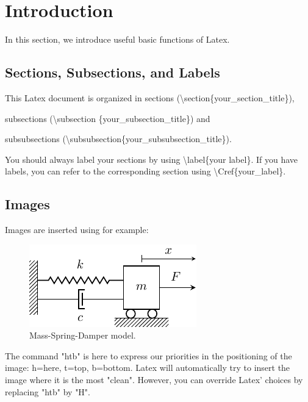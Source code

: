 \section{Introduction}\label{introduction}


In this section, we introduce useful basic functions of Latex. 
    
\subsection{Sections, Subsections, and Labels}\label{sections_subsections_labels}

This Latex document is organized in sections (\textbackslash section\{your\_section\_title\}), 

subsections (\textbackslash subsection \{your\_subsection\_title\}) and 

subsubsections (\textbackslash subsubsection\{your\_subsubsection\_title\}).

You should always label your sections by using \textbackslash label\{your label\}. If you have labels, you can refer to the corresponding section using \textbackslash Cref\{your\_label\}.


\subsection{Images}\label{images}

Images are inserted using for example:

\begin{figure}[htb]
    \centering
    \includegraphics[width=0.4\linewidth]{000_introduction/images/Theoretical Background/Spring_Mass_Damper.pdf}
    \caption{Mass-Spring-Damper model.}
    \label{fig:mass_spring_damper}
\end{figure}

The command "htb" is here to express our priorities in the positioning of the image: h=here, t=top, b=bottom. Latex will automatically try to insert the image where it is the most "clean". However, you can override Latex' choices by replacing "htb" by "H".

